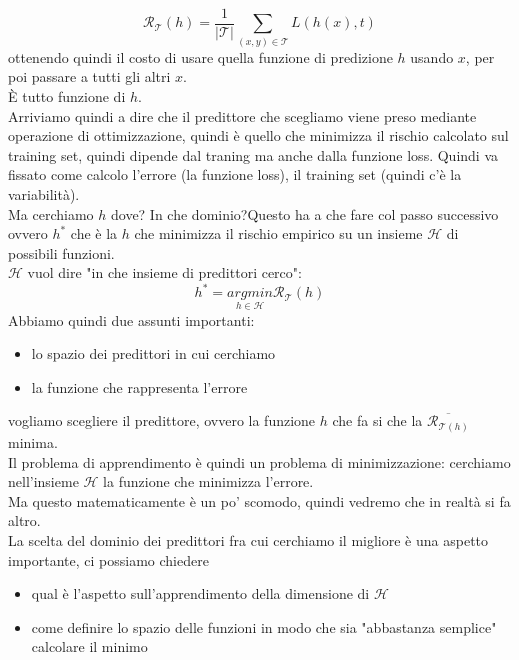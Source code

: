 \documentclass[12pt, oneside]{extbook}
\begin{document}
\begin{equation}
	\mathscr{R}_\mathscr{T}(h) = \frac{1}{|\mathscr{T}|} \sum\limits_{(x,y) \in \mathscr{T}} L(h(x),t)
\end{equation}
ottenendo quindi il costo di usare quella funzione di predizione $h$ usando $x$, per poi passare a tutti gli altri $x$.\\È tutto funzione di $h$.\\Arriviamo quindi a dire che il predittore che scegliamo viene preso mediante operazione di ottimizzazione, quindi è quello che minimizza il rischio calcolato sul training set, quindi dipende dal traning ma anche dalla funzione loss. Quindi va fissato come calcolo l'errore (la funzione loss), il training set (quindi c'è la variabilità).\\Ma cerchiamo $h$ dove? In che dominio?Questo ha a che fare col passo successivo ovvero $h^*$ che è la $h$ che minimizza il rischio empirico su un insieme $\mathscr{H}$ di possibili funzioni.\\$\mathscr{H}$ vuol dire "in che insieme di predittori cerco":
\begin{equation}
	h^* = \underset{h \in \mathscr{H}}{argmin}\mathscr{R}_{\mathscr{T}}(h)
\end{equation}
Abbiamo quindi due assunti importanti:
\begin{itemize}
	\item lo spazio dei predittori in cui cerchiamo
	\item la funzione che rappresenta l'errore
\end{itemize}
vogliamo scegliere il predittore, ovvero la funzione $h$ che fa si che la $\overline{\mathscr{R}_{\mathscr{T}(h)}}$ minima.\\Il problema di apprendimento è quindi un problema di minimizzazione: cerchiamo nell'insieme $\mathscr{H}$ la funzione che minimizza l'errore.\\Ma questo matematicamente è un po' scomodo, quindi vedremo che in realtà si fa altro.\\La scelta del dominio dei predittori fra cui cerchiamo il migliore è una aspetto importante, ci possiamo chiedere 
	\begin{itemize}
		\item qual è l'aspetto sull'apprendimento della dimensione di $\mathscr{H}$
		\item come definire lo spazio delle funzioni in modo che sia "abbastanza semplice" calcolare il minimo
	\end{itemize}
\end{document}
